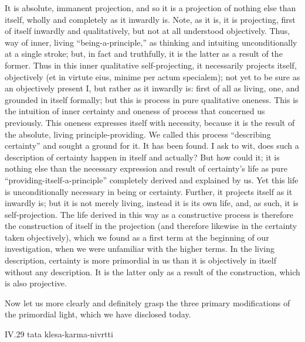 It is absolute, immanent projection,
and so it is a projection of nothing else than itself,
wholly and completely as it inwardly is.
Note, as it is, it is projecting,
first of itself inwardly and qualitatively,
but not at all understood objectively.
Thus, way of inner, living “being-a-principle,”
as thinking and intuiting unconditionally at a single stroke;
but, in fact and truthfully, it is the latter as a result of the former.
Thus in this inner qualitative self-projecting,
it necessarily projects itself, objectively
(et in virtute eius, minime per actum specialem);
not yet to be sure as an objectively present I,
but rather as it inwardly is:
first of all as living, one, and grounded in itself formally;
but this is process in pure qualitative oneness.
This is the intuition of inner certainty
and oneness of process that concerned us previously.
This oneness expresses itself with necessity,
because it is the result of
the absolute, living principle-providing.
We called this process “describing certainty”
and sought a ground for it.
It has been found.
I ask to wit, does such a description of certainty
happen in itself and actually?
But how could it; it is nothing else than
the necessary expression and result of certainty's life
as pure “providing-itself-a-principle”
completely derived and explained by us.
Yet this life is unconditionally necessary in being or certainty.
Further, it projects itself as it inwardly is;
but it is not merely living, instead it is its own life,
and, as such, it is self-projection.
The life derived in this way as a constructive process is
therefore the construction of itself in the projection
(and therefore likewise in the certainty taken objectively),
which we found as a first term at the beginning of our investigation,
when we were unfamiliar with the higher terms.
In the living description, certainty is
more primordial in us than it is
objectively in itself without any description.
It is the latter only as
a result of the construction,
which is also projective.

Now let us more clearly and definitely grasp
the three primary modifications of the primordial light,
which we have disclosed today.

IV.29
tata klesa-karma-nivrtti

